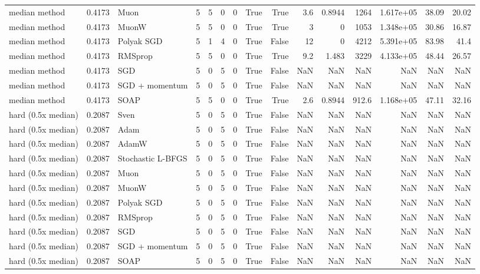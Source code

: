 \begin{tabular}{lrlrrrrrrrrrrrr}
median method & 0.4173 & Muon & 5 & 5 & 0 & 0 & True & True & 3.6 & 0.8944 & 1264 & 1.617e+05 & 38.09 & 20.02 \\
median method & 0.4173 & MuonW & 5 & 5 & 0 & 0 & True & True & 3 & 0 & 1053 & 1.348e+05 & 30.86 & 16.87 \\
median method & 0.4173 & Polyak SGD & 5 & 1 & 4 & 0 & True & False & 12 & 0 & 4212 & 5.391e+05 & 83.98 & 41.4 \\
median method & 0.4173 & RMSprop & 5 & 5 & 0 & 0 & True & True & 9.2 & 1.483 & 3229 & 4.133e+05 & 48.44 & 26.57 \\
median method & 0.4173 & SGD & 5 & 0 & 5 & 0 & True & False & NaN & NaN & NaN & NaN & NaN & NaN \\
median method & 0.4173 & SGD + momentum & 5 & 0 & 5 & 0 & True & False & NaN & NaN & NaN & NaN & NaN & NaN \\
median method & 0.4173 & SOAP & 5 & 5 & 0 & 0 & True & True & 2.6 & 0.8944 & 912.6 & 1.168e+05 & 47.11 & 32.16 \\
hard (0.5x median) & 0.2087 & Sven & 5 & 0 & 5 & 0 & True & False & NaN & NaN & NaN & NaN & NaN & NaN \\
hard (0.5x median) & 0.2087 & Adam & 5 & 0 & 5 & 0 & True & False & NaN & NaN & NaN & NaN & NaN & NaN \\
hard (0.5x median) & 0.2087 & AdamW & 5 & 0 & 5 & 0 & True & False & NaN & NaN & NaN & NaN & NaN & NaN \\
hard (0.5x median) & 0.2087 & Stochastic L-BFGS & 5 & 0 & 5 & 0 & True & False & NaN & NaN & NaN & NaN & NaN & NaN \\
hard (0.5x median) & 0.2087 & Muon & 5 & 0 & 5 & 0 & True & False & NaN & NaN & NaN & NaN & NaN & NaN \\
hard (0.5x median) & 0.2087 & MuonW & 5 & 0 & 5 & 0 & True & False & NaN & NaN & NaN & NaN & NaN & NaN \\
hard (0.5x median) & 0.2087 & Polyak SGD & 5 & 0 & 5 & 0 & True & False & NaN & NaN & NaN & NaN & NaN & NaN \\
hard (0.5x median) & 0.2087 & RMSprop & 5 & 0 & 5 & 0 & True & False & NaN & NaN & NaN & NaN & NaN & NaN \\
hard (0.5x median) & 0.2087 & SGD & 5 & 0 & 5 & 0 & True & False & NaN & NaN & NaN & NaN & NaN & NaN \\
hard (0.5x median) & 0.2087 & SGD + momentum & 5 & 0 & 5 & 0 & True & False & NaN & NaN & NaN & NaN & NaN & NaN \\
hard (0.5x median) & 0.2087 & SOAP & 5 & 0 & 5 & 0 & True & False & NaN & NaN & NaN & NaN & NaN & NaN \\
\bottomrule
\end{tabular}
